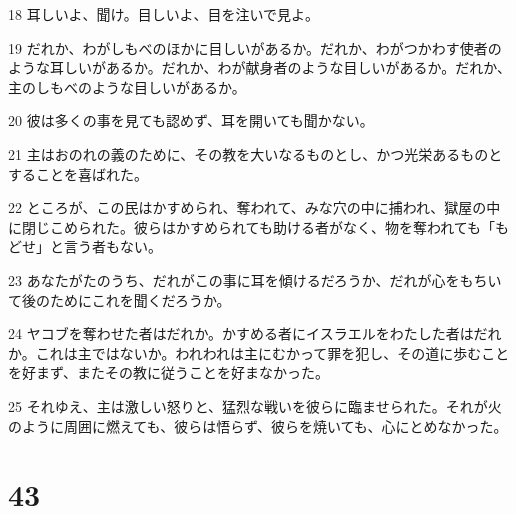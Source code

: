 \par 18 耳しいよ、聞け。目しいよ、目を注いで見よ。
\par 19 だれか、わがしもべのほかに目しいがあるか。だれか、わがつかわす使者のような耳しいがあるか。だれか、わが献身者のような目しいがあるか。だれか、主のしもべのような目しいがあるか。
\par 20 彼は多くの事を見ても認めず、耳を開いても聞かない。
\par 21 主はおのれの義のために、その教を大いなるものとし、かつ光栄あるものとすることを喜ばれた。
\par 22 ところが、この民はかすめられ、奪われて、みな穴の中に捕われ、獄屋の中に閉じこめられた。彼らはかすめられても助ける者がなく、物を奪われても「もどせ」と言う者もない。
\par 23 あなたがたのうち、だれがこの事に耳を傾けるだろうか、だれが心をもちいて後のためにこれを聞くだろうか。
\par 24 ヤコブを奪わせた者はだれか。かすめる者にイスラエルをわたした者はだれか。これは主ではないか。われわれは主にむかって罪を犯し、その道に歩むことを好まず、またその教に従うことを好まなかった。
\par 25 それゆえ、主は激しい怒りと、猛烈な戦いを彼らに臨ませられた。それが火のように周囲に燃えても、彼らは悟らず、彼らを焼いても、心にとめなかった。

\chapter{43}


